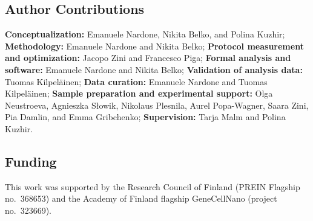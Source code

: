 \documentclass[preprint,12pt]{elsarticle}
\begin{document}
\subsection*{Author Contributions}
\noindent
\textbf{Conceptualization:} Emanuele Nardone, Nikita Belko, and Polina Kuzhir;
\textbf{Methodology:} Emanuele Nardone and Nikita Belko;
\textbf{Protocol measurement and optimization:} Jacopo Zini and Francesco Piga;
\textbf{Formal analysis and software:} Emanuele Nardone and Nikita Belko;
\textbf{Validation of analysis data:} Tuomas Kilpeläinen;
\textbf{Data curation:} Emanuele Nardone and Tuomas Kilpeläinen;
\textbf{Sample preparation and experimental support:} Olga Neustroeva, Agnieszka Słowik, Nikolaus Plesnila, Aurel Popa-Wagner, Saara Zini, Pia Damlin, and Emma Gribchenko;
\textbf{Supervision:} Tarja Malm and Polina Kuzhir.

\subsection*{Funding}
This work was supported by the Research Council of Finland (PREIN Flagship no.\ 368653) and the Academy of Finland flagship GeneCellNano (project no.\ 323669).



\end{document}
